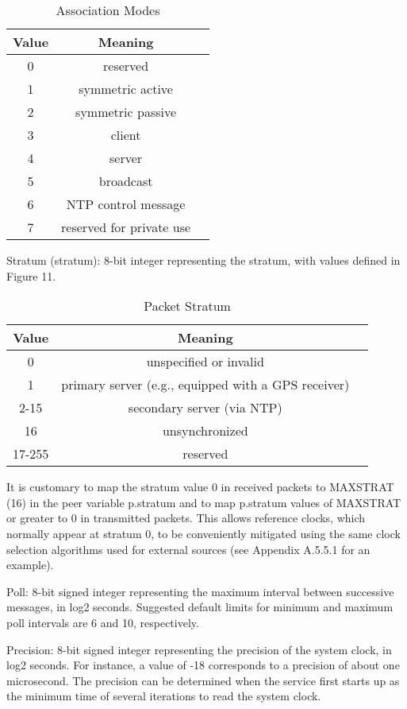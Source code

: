 \begin{table}[htb]
\center
\begin{tabular}{c | c | c}
Value & Meaning \\
\hline
\hline
0 & reserved \\
1 & symmetric active \\
2 & symmetric passive \\
3 & client \\
4 & server \\
5 & broadcast \\
6 & NTP control message \\
7 & reserved for private use \\
\hline
\end{tabular}
\label{association_modes}
\caption{Association Modes}
\end{table}

Stratum (stratum): 8-bit integer representing the stratum, with
values defined in Figure 11.

\begin{table}[htb]
\center
\begin{tabular}{c | c | c}
Value & Meaning \\
\hline
\hline
0 & unspecified or invalid \\
1 & primary server (e.g., equipped with a GPS receiver) \\
2-15 & secondary server (via NTP) \\
16 & unsynchronized \\
17-255 & reserved \\
\hline
\end{tabular}
\label{packet_stratum}
\caption{Packet Stratum}
\end{table}

It is customary to map the stratum value 0 in received packets to
MAXSTRAT (16) in the peer variable p.stratum and to map p.stratum
values of MAXSTRAT or greater to 0 in transmitted packets. This
allows reference clocks, which normally appear at stratum 0, to be
conveniently mitigated using the same clock selection algorithms used
for external sources (see Appendix A.5.5.1 for an example).

Poll: 8-bit signed integer representing the maximum interval between
successive messages, in log2 seconds. Suggested default limits for
minimum and maximum poll intervals are 6 and 10, respectively.

Precision: 8-bit signed integer representing the precision of the
system clock, in log2 seconds. For instance, a value of -18
corresponds to a precision of about one microsecond. The precision
can be determined when the service first starts up as the minimum
time of several iterations to read the system clock.

